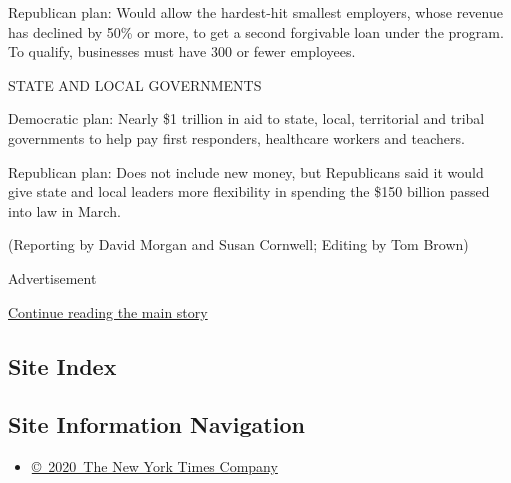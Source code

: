 Republican plan: Would allow the hardest-hit smallest employers, whose
revenue has declined by 50\% or more, to get a second forgivable loan
under the program. To qualify, businesses must have 300 or fewer
employees.

STATE AND LOCAL GOVERNMENTS

Democratic plan: Nearly \$1 trillion in aid to state, local, territorial
and tribal governments to help pay first responders, healthcare workers
and teachers.

Republican plan: Does not include new money, but Republicans said it
would give state and local leaders more flexibility in spending the
\$150 billion passed into law in March.

(Reporting by David Morgan and Susan Cornwell; Editing by Tom Brown)

Advertisement

\protect\hyperlink{after-bottom}{Continue reading the main story}

\hypertarget{site-index}{%
\subsection{Site Index}\label{site-index}}

\hypertarget{site-information-navigation}{%
\subsection{Site Information
Navigation}\label{site-information-navigation}}

\begin{itemize}
\tightlist
\item
  \href{https://help.nytimes3xbfgragh.onion/hc/en-us/articles/115014792127-Copyright-notice}{©~2020~The
  New York Times Company}
\end{itemize}

